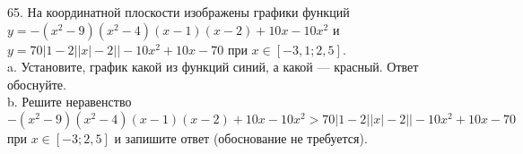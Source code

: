 65. На координатной плоскости изображены графики функций $y=-(x^2-9)(x^2-4)(x-1)(x-2)+10x-10x^2$ и $y=70|1-2||x|-2||-10x^2+10x-70$ при
$x\in[-3,1;2,5].$\\
a. Установите, график какой из функций синий, а какой --- красный. Ответ обоснуйте.\\
b. Решите неравенство  $-(x^2-9)(x^2-4)(x-1)(x-2)+10x-10x^2 >70|1-2||x|-2||-10x^2+10x-70$ при
$x\in[-3;2,5]$ и запишите ответ (обоснование не требуется).
\begin{center}\end{center}
